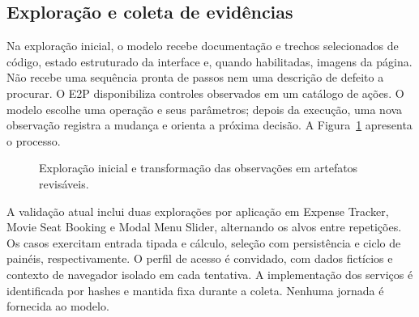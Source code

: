 \documentclass[12pt]{article}
\begin{document}
\subsection{Exploração e coleta de evidências}
Na exploração inicial, o modelo recebe documentação e trechos selecionados de código, estado estruturado da interface e, quando habilitadas, imagens da página. Não recebe uma sequência pronta de passos nem uma descrição de defeito a procurar. O E2P disponibiliza controles observados em um catálogo de ações. O modelo escolhe uma operação e seus parâmetros; depois da execução, uma nova observação registra a mudança e orienta a próxima decisão. A Figura~\ref{fig:pipeline} apresenta o processo.

\begin{figure}[ht]
\centering
{}
\caption{Exploração inicial e transformação das observações em artefatos revisáveis.}
\label{fig:pipeline}
\end{figure}

A validação atual inclui duas explorações por aplicação em Expense Tracker, Movie Seat Booking e Modal Menu Slider, alternando os alvos entre repetições. Os casos exercitam entrada tipada e cálculo, seleção com persistência e ciclo de painéis, respectivamente. O perfil de acesso é convidado, com dados fictícios e contexto de navegador isolado em cada tentativa. A implementação dos serviços é identificada por hashes e mantida fixa durante a coleta. Nenhuma jornada é fornecida ao modelo.
\end{document}
